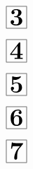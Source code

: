 \documentclass[a4paper, 10pt]{article}
\begin{document}
\thispagestyle{empty}
\begin{minipage}[t]{0.17\textwidth}
                \vspace*{-1.59cm}
        \hspace*{2.4cm}
        $\boxed{\textbf{\Huge3}}$
\end{minipage}
\begin{minipage}[t]{0.83\textwidth}
        
\end{minipage}

\thispagestyle{empty}
\thispagestyle{empty}
\begin{minipage}[t]{0.17\textwidth}
                \vspace*{-1.59cm}
        \hspace*{2.4cm}
        $\boxed{\textbf{\Huge4}}$
\end{minipage}
\begin{minipage}[t]{0.83\textwidth}
        
\end{minipage}

\thispagestyle{empty}
\begin{minipage}[t]{0.17\textwidth}
                \vspace*{-1.59cm}
        \hspace*{2.4cm}
        $\boxed{\textbf{\Huge5}}$
\end{minipage}
\begin{minipage}[t]{0.83\textwidth}
        
\end{minipage}

\thispagestyle{empty}
\begin{minipage}[t]{0.17\textwidth}
                \vspace*{-1.59cm}
        \hspace*{2.4cm}
        $\boxed{\textbf{\Huge6}}$
\end{minipage}
\begin{minipage}[t]{0.83\textwidth}
        
\end{minipage}

\thispagestyle{empty}
\begin{minipage}[t]{0.17\textwidth}
                \vspace*{-1.59cm}
        \hspace*{2.4cm}
        $\boxed{\textbf{\Huge7}}$
\end{minipage}
\begin{minipage}[t]{0.83\textwidth}
        
\end{minipage}
\end{document}
